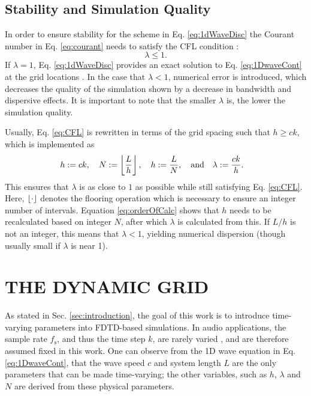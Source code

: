 \documentclass[fleqn]{jaes}
\begin{document}
\subsection{Stability and Simulation Quality}\label{sec:quality}
In order to ensure stability for the scheme in Eq. \eqref{eq:1dWaveDisc} the Courant number in Eq. \eqref{eq:courant} needs to satisfy the CFL condition \cite{Courant1928}:
\begin{equation}\label{eq:CFL}
    \lambda \leq 1.
\end{equation}
%
If $\lambda = 1$, Eq. \eqref{eq:1dWaveDisc} provides an exact solution to Eq. \eqref{eq:1DwaveCont} at the grid locations \cite{Bilbao2009}. In the case that $\lambda < 1$, numerical error is introduced, which decreases the quality of the simulation shown by a decrease in bandwidth and dispersive effects. It is important to note that the smaller $\lambda$ is, the lower the simulation quality.

Usually, Eq. \eqref{eq:CFL} is rewritten in terms of the grid spacing such that $h \geq c k$,
which is implemented as
\begin{equation}\label{eq:orderOfCalc}
    \!\!\!\!\!h:=ck, \quad N := \floor[\frac{L}{h}],\quad h := \frac{L}{N},\qaq \lambda := \frac{ck}{h}.
\end{equation}
This ensures that $\lambda$ is as close to $1$ as possible while still satisfying Eq. \eqref{eq:CFL}. Here, $\floor[\cdot]$ denotes the flooring operation which is necessary to ensure an integer number of intervals. Equation \eqref{eq:orderOfCalc} shows that $h$ needs to be recalculated based on integer $N$, after which $\lambda$ is calculated from this. If $L/h$ is not an integer, this means that $\lambda < 1$, yielding numerical dispersion (though usually small if $\lambda$ is near 1).

\section{THE DYNAMIC GRID}\label{sec:dynamicGrid}
As stated in Sec. \ref{sec:introduction}, the goal of this work is to introduce time-varying parameters into FDTD-based simulations. In audio applications, the sample rate $f_\text{s}$, and thus the time step $k$, are rarely varied \cite{Bilbao2009}, and are therefore assumed fixed in this work. One can observe from the 1D wave equation in Eq. \eqref{eq:1DwaveCont}, that the wave speed $c$ and system length $L$ are the only parameters that can be made time-varying; the other variables, such as $h$, $\lambda$ and $N$ are derived from these physical parameters. 
\end{document}
